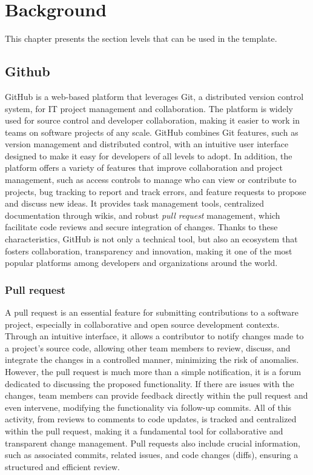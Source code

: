 \chapter{Background}
\thispagestyle{plain}


This chapter presents the section levels that can be used in the template. 


\section{Github}
GitHub is a web-based platform that leverages Git, a distributed version control system, for IT project management and collaboration. 
The platform is widely used for source control and developer collaboration, making it easier to work in teams on software projects of any scale.
GitHub combines Git features, such as version management and distributed control, with an intuitive user interface designed to make it easy for developers of all levels to adopt.
In addition, the platform offers a variety of features that improve collaboration and project management, such as access controls to manage who can view or contribute to projects,
bug tracking to report and track errors, and feature requests to propose and discuss new ideas.
It provides task management tools, centralized documentation through wikis, and robust \textit{pull request} management, which facilitate code reviews and secure integration of changes.
Thanks to these characteristics, GitHub is not only a technical tool, but also an ecosystem that fosters collaboration, transparency and innovation, making it one of the most popular platforms among developers and organizations around the world.
\subsection{Pull request}
A pull request is an essential feature for submitting contributions to a software project, especially in collaborative and open source development contexts.
Through an intuitive interface, it allows a contributor to notify changes made to a project's source code, allowing other team members to review, discuss, and integrate the changes in a controlled manner, minimizing the risk of anomalies.
However, the pull request is much more than a simple notification, it is a forum dedicated to discussing the proposed functionality.
If there are issues with the changes, team members can provide feedback directly within the pull request and even intervene, modifying the functionality via follow-up commits.
All of this activity, from reviews to comments to code updates, is tracked and centralized within the pull request, making it a fundamental tool for collaborative and transparent change management.
Pull requests also include crucial information, such as associated commits, related issues, and code changes (diffs), ensuring a structured and efficient review.
